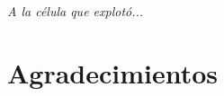 \documentclass[letterpaper, 11pt]{book}
\theoremstyle{definition}
\theoremstyle{remark}
\begin{document}
\clearpage\thispagestyle{empty}\mbox{}\clearpage


\thispagestyle{empty}
\begin{flushright}
\vspace*{5em}
\textit{A la célula que explotó...}
\end{flushright}



\newpage

\thispagestyle{empty}

\vspace*{\fill}
\section*{Agradecimientos}
\end{document}
